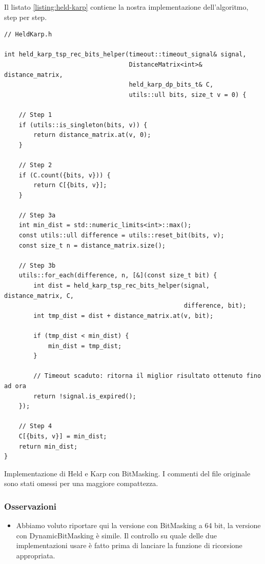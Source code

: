 \noindent Il listato \ref{listing:held-karp} contiene la nostra implementazione dell'algoritmo, step per step.

\begin{listing}[!ht]
\begin{verbatim}
// HeldKarp.h

int held_karp_tsp_rec_bits_helper(timeout::timeout_signal& signal,
                                  DistanceMatrix<int>& distance_matrix,
                                  held_karp_dp_bits_t& C,
                                  utils::ull bits, size_t v = 0) {

    // Step 1
    if (utils::is_singleton(bits, v)) {
        return distance_matrix.at(v, 0);
    }

    // Step 2
    if (C.count({bits, v})) {
        return C[{bits, v}];
    }

    // Step 3a
    int min_dist = std::numeric_limits<int>::max();
    const utils::ull difference = utils::reset_bit(bits, v);
    const size_t n = distance_matrix.size();

    // Step 3b
    utils::for_each(difference, n, [&](const size_t bit) {
        int dist = held_karp_tsp_rec_bits_helper(signal, distance_matrix, C,
                                                 difference, bit);
        int tmp_dist = dist + distance_matrix.at(v, bit);

        if (tmp_dist < min_dist) {
            min_dist = tmp_dist;
        }

        // Timeout scaduto: ritorna il miglior risultato ottenuto fino ad ora
        return !signal.is_expired();
    });

    // Step 4
    C[{bits, v}] = min_dist;
    return min_dist;
}

\end{verbatim}
\caption{Implementazione di Held e Karp con BitMasking. I commenti del file originale sono stati omessi per una maggiore compattezza.}
\label{listing:held-karp}
\end{listing}

\subsubsection{Osservazioni}

\begin{itemize}
    \item Abbiamo voluto riportare qui la versione con BitMasking a 64 bit, la versione con DynamicBitMasking è simile. Il controllo su quale delle due implementazioni usare è fatto prima di lanciare la funzione di ricorsione appropriata.\\
\end{itemize}

